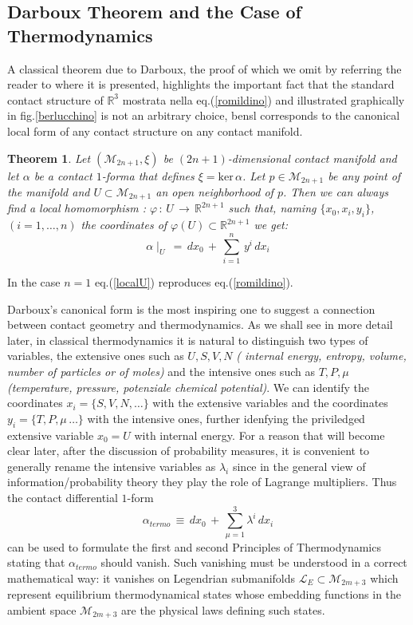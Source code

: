 \documentclass[10pt,a4paper]{article}
\newtheorem{teorema}{Theorem}[section]
\begin{document}
\subsection{Darboux Theorem and the Case of Thermodynamics}
\label{darbone}
A classical theorem due to Darboux, the proof of which we omit by referring the reader to \cite{contatoregeiges} where it is presented, highlights the important fact that the standard contact structure of $\mathbb{R}^3$ mostrata nella
eq.(\ref{romildino}) and illustrated graphically in
fig.\ref{berlucchino} is not an arbitrary choice, bensl corresponds to the canonical local form
of any contact structure on any contact manifold.
\begin{teorema}
\label{darbuso} Let  $\left(\mathcal{M}_{2n+1},\xi\right)$  be
$(2n+1)$-dimensional contact manifold  and let $\alpha$ be
 a contact $1$-forma that defines $\xi = \text{ker}\,\alpha$. Let
$p\in \mathcal{M}_{2n+1}$ be any point of the manifold and
$U \subset \mathcal{M}_{2n+1}$ an open neighborhood of  $p$. Then we
can always find a local homomorphism : $\varphi \, : \, U
\, \to \, \mathbb{R}^{2n+1}$ such that, naming
$\{x_0,x_i,y_i\}$,$(i=1,\dots,n)$ the coordinates of $\varphi(U)
\subset \mathbb{R}^{2n+1}$ we get:
\begin{equation}\label{localU}
    \alpha\mid_{U} \, = \, dx_0 \, + \,\sum_{i=1}^n \,y^i\,dx_i
\end{equation}
\end{teorema}
In the case $n=1$ eq.(\ref{localU}) reproduces eq.(\ref{romildino}).
\par
Darboux's canonical form is the most inspiring one to suggest a connection between contact geometry and thermodynamics. As we shall see in more detail later, in classical thermodynamics it is natural to distinguish two types of variables,
the extensive ones such as $U,S,V,N$ \textit{ ( internal energy,
entropy, volume, number of particles or of moles)} and the intensive ones such as $T,P,\mu$ \textit{(temperature, pressure, potenziale chemical potential)}.
We can identify the coordinates $x_i=\{S,V,N,\dots\}$ with the extensive
variables and the  coordinates $y_i=\{T,P,\mu\,\dots\}$ with the intensive ones,
further  idenfying the priviledged extensive
variable $x_0=U$ with internal energy. For a reason that will become clear later, after the discussion of probability measures, it is convenient to generally rename the intensive variables as $\lambda_i$ since in the general view of information/probability theory they play the role of Lagrange multipliers. Thus the contact differential $1$-form
\begin{equation}\label{formalpt}
    \alpha_{termo} \, \equiv \, dx_0 \, + \, \sum_{\mu=1}^{3} \lambda^i \,
    dx_i
\end{equation}
can be used to formulate the first and second Principles of Thermodynamics stating that $\alpha_{termo}$ should vanish.
Such vanishing must be understood in a correct mathematical way: it vanishes on  Legendrian submanifolds
$\mathcal{L}_E\subset \mathcal{M}_{2m+3}$ which represent equilibrium thermodynamical states whose embedding functions in the ambient space $\mathcal{M}_{2m+3}$ are the physical laws defining such states.
\end{document}
